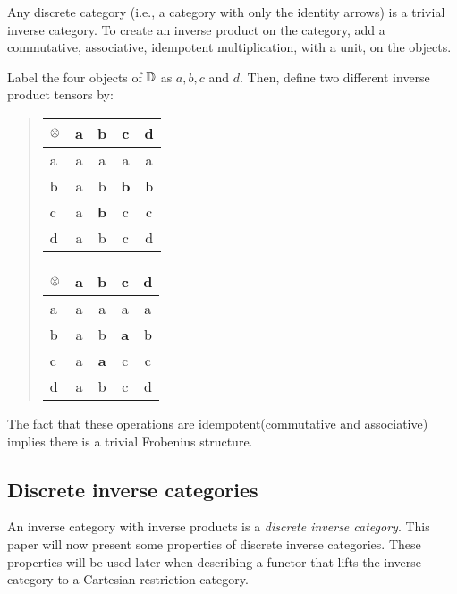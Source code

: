 \begin{example}
  \label{example:invprodisstructure}
\end{example}
Any discrete category (i.e., a category with only the identity arrows) is a trivial inverse
category. To create an inverse product on the category, add a commutative, associative, idempotent
multiplication, with a unit, on the objects.

Label the four objects of $\mathbb{D}$ as $a,b,c$ and $d$. Then, define two different inverse product
tensors by:
\begin{quote}
  \qquad\qquad
  \begin{tabular}{|l||c|c|c|c|} 
    \hline
    $\otimes$&a&b&c&d\\ \hline \hline
    a&a&a&a&a\\ \hline
    b&a&b&\textbf{b}&b\\ \hline
    c&a&\textbf{b}&c&c \\ \hline
    d&a&b&c&d \\ \hline
  \end{tabular}
  \hfil
  \begin{tabular}{|l||c|c|c|c|} 
    \hline
    $\otimes$&a&b&c&d\\ \hline \hline
    a&a&a&a&a\\ \hline
    b&a&b&\textbf{a}&b\\ \hline
    c&a&\textbf{a}&c&c \\ \hline
    d&a&b&c&d \\ \hline
  \end{tabular}
  \qquad \qquad
\end{quote}

The fact that these operations are idempotent(commutative and associative) implies there is a
trivial Frobenius structure.



\subsection{Discrete inverse categories} %
\label{sub:discrete_inverse_categories}


An inverse category with inverse products is a \emph{discrete inverse category}. This paper will
now present some properties of discrete inverse categories. These properties will be used later
when describing a functor that lifts the inverse category to a Cartesian restriction category.


